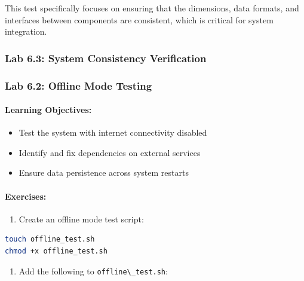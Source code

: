 \documentclass[
  screen,review,acmlarge]{acmart}
\newcommand{\passthrough}[1]{#1}
\providecommand{\tightlist}{%
  \setlength{\itemsep}{0pt}\setlength{\parskip}{0pt}}
\begin{document}
This test specifically focuses on ensuring that the dimensions, data formats, and interfaces between components are consistent, which is critical for system integration.

\subsubsection{Lab 6.3: System Consistency Verification}\label{lab-6.3-system-consistency-verification}

\subsubsection{Lab 6.2: Offline Mode Testing}\label{lab-6.2-offline-mode-testing}

\paragraph{Learning Objectives:}\label{learning-objectives-9}

\begin{itemize}
\tightlist
\item
  Test the system with internet connectivity disabled
\item
  Identify and fix dependencies on external services
\item
  Ensure data persistence across system restarts
\end{itemize}

\paragraph{Exercises:}\label{exercises-8}

\begin{enumerate}
\def\labelenumi{\arabic{enumi}.}
\tightlist
\item
  Create an offline mode test script:
\end{enumerate}

\begin{lstlisting}[language=bash]
touch offline_test.sh
chmod +x offline_test.sh
\end{lstlisting}

\begin{enumerate}
\def\labelenumi{\arabic{enumi}.}
\setcounter{enumi}{1}
\tightlist
\item
  Add the following to \passthrough{\lstinline!offline\_test.sh!}:
\end{enumerate}
\end{document}

